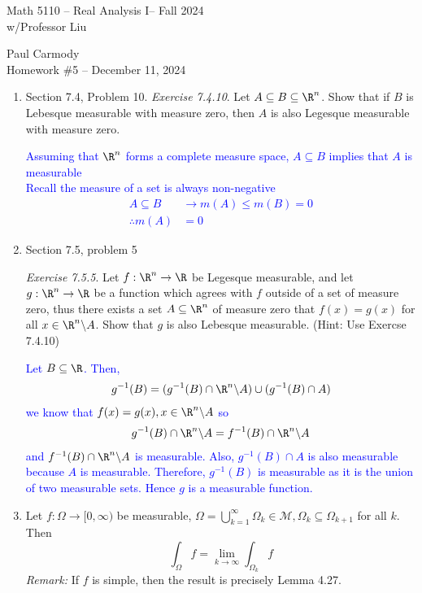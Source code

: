\documentclass[10pt,a4paper]{report}
\newcommand{\CLASSNAME}{Math 5110 -- Real Analysis I}
\newcommand{\STUDENTNAME}{Paul Carmody}
\newcommand{\ASSIGNMENT}{Homework \#5 }
\newcommand{\DUEDATE}{December 11, 2024}
\newcommand{\SEMESTER}{Fall 2024}
\newcommand{\BLUE}[1]{\textcolor{blue}{#1}}
\begin{document}
\begin{center}
	\Large{\CLASSNAME -- \SEMESTER} \\
	\large{ w/Professor Liu}
\end{center}
\begin{center}
	\STUDENTNAME \\
	\ASSIGNMENT -- \DUEDATE\\
\end{center} 

\newcommand{\VOL}{\text{ vol}}
\begin{enumerate}[label=\Roman*.]
\item Section 7.4, Problem 10.
	\textit{Exercise 7.4.10}.  Let $A \subseteq B \subseteq \R^n$.  Show that if $B$ is Lebesque measurable with measure zero, then $A$ is also Legesque measurable with measure zero.
	
	\BLUE{Assuming that $\R^n$ forms a complete measure space, $A\subseteq B$ implies that $A$ is measurable \\
	Recall the measure of a set is always non-negative
		\begin{align*}
			A \subseteq B &\to m(A) \le m(B) = 0\\
			\therefore m(A) &= 0
		\end{align*}
	}
	
\item Section 7.5, problem 5

	\textit{Exercise 7.5.5}.  Let $f: \R^n \to \R$ be Legesque measurable, and let $g: \R^n \to \R$ be a function which agrees with $f$ outside of a set of measure zero, thus there exists a set $A \subseteq \R^n$ of measure zero that $f(x) = g(x)$ for all $x \in \R^n\backslash A$.  Show that $g$ is also Lebesque measurable.  (Hint: Use Exercse 7.4.10)
	
	\BLUE{Let $B \subseteq \R$. Then,
	\begin{align*}
		g^{-1}(B) = (g^{-1}(B)\cap \R^n\backslash A) \cup (g^{-1}(B)\cap A)
	\end{align*}we know that $f(x)=g(x), x \in \R^n\backslash A$ so
	\begin{align*}
		g^{-1}(B)\cap \R^n\backslash A = f^{-1}(B)\cap \R^n\backslash A
	\end{align*}and $f^{-1}(B)\cap \R^n\backslash A$ is measurable. Also, $g^{-1}(B)\cap A$ is also measurable because $A$ is measurable.  Therefore, $g^{-1}(B)$ is measurable as it is the union of two measurable sets.  Hence $g$ is a measurable function.
	}

\item Let $f:\Omega \to [0,\infty)$ be measurable, $\Omega =\bigcup_{k=1}^\infty \Omega_k \in \mathcal{M}, \Omega_k \subseteq \Omega_{k+1}$  for all $k$.  Then $$ \int_\Omega f = \lim_{k\to \infty} \int_{\Omega_k} f$$\textit{Remark:}  If $f$ is simple, then the result is precisely Lemma 4.27.


\end{enumerate}
\end{document}
